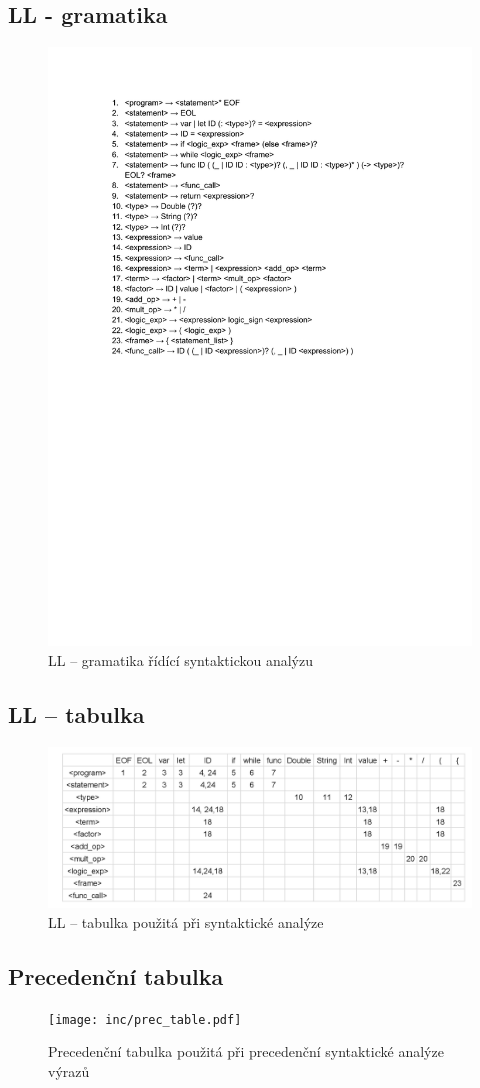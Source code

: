 \documentclass[a4paper, 11pt]{article}
\begin{document}
	\subsection{LL - gramatika}
	\begin{figure}[!ht]
		\centering
		\vspace{-1.2cm}
		\includegraphics[width=0.95\linewidth]{LL_gramatika.pdf}
		\caption{LL -- gramatika řídící syntaktickou analýzu }
		\label{figure:ll_gramatika}
	\end{figure}


	\subsection{LL -- tabulka}
	\begin{figure}[!ht]
		\centering
		\includegraphics[width=1\linewidth]{LL_table.png}
		\caption{LL -- tabulka použitá při syntaktické analýze}
		\label{figure:ll_tabulka}
	\end{figure}


	\subsection{Precedenční tabulka}
	\begin{figure}[!ht]
		\centering
		\texttt{[image: inc/prec\_table.pdf]}
		\caption{Precedenční tabulka použitá při precedenční syntaktické analýze výrazů}
		\label{figure:prec_tabulka}
	\end{figure}
\end{document}
